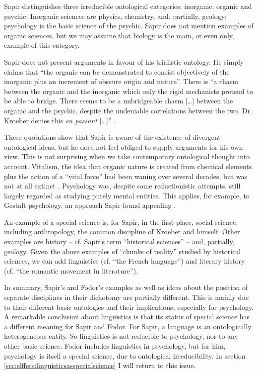 \documentclass[output=paper]{langscibook}
\begin{document}
Sapir distinguishes three irreducible ontological categories: inorganic, organic and psychic. Inorganic sciences are physics, chemistry, and, partially, geology; psychology is the basic science of the psychic. Sapir does not mention examples of organic sciences, but we may assume that biology is the main, or even only, example of this category.

Sapir does not present arguments in favour of his trialistic ontology. He simply claims that ``the organic can be demonstrated to consist objectively of the inorganic plus an increment of obscure origin and nature''. There is ``a chasm between the organic and the inorganic which only the rigid mechanists pretend to be able to bridge. There seems to be a unbridgeable chasm […] between the organic and the psychic, despite the undeniable correlations between the two. Dr. Kroeber denies this \emph{en passant} […]'' \citep[444]{Sapir1917}.

These quotations show that Sapir is aware of the existence of divergent ontological ideas, but he does not feel obliged to supply arguments for his own view. This is not surprising when we take contemporary ontological thought into account. Vitalism, the idea that organic nature is created from chemical elements plus the action of a ``vital force'' had been waning over several decades, but was not at all extinct \citep[cf.][]{Beckner1967}. Psychology was, despite some reductionistic attempts, still largely regarded as studying purely mental entities. This applies, for example, to Gestalt psychology, an approach Sapir found appealing \citep[cf.][xvi]{Sapir1994}.

An example of a special science is, for Sapir, in the first place, social science, including anthropology, the common discipline of Kroeber and himself. Other examples are history – cf. Sapir's term ``historical sciences'' – and, partially, geology. Given the above examples of ``chunks of reality'' studied by historical sciences, we can add linguistics (cf. ``the French language'') and literary history (cf. ``the romantic movement in literature'').

In summary, Sapir's and Fodor's examples as well as ideas about the position of separate disciplines in their dichotomy are partially different. This is mainly due to their different basic ontologies and their implications, especially for psychology. A remarkable conclusion about linguistics is that its status of special science has a different meaning for Sapir and Fodor. For Sapir, a language is an ontologically heterogeneous entity. So linguistics is not reducible to psychology, nor to any other basic science. Fodor includes linguistics in psychology, but for him, psychology is itself a special science, due to ontological irreducibility. In section \ref{sec:elffers:linguisticsasspecialscience} I will return to this issue.
\end{document}
